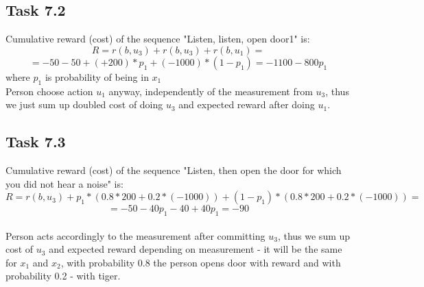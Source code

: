 \documentclass[english]{scrartcl}
\begin{document}
\subsection*{Task 7.2}
Cumulative reward (cost) of the sequence "Listen, listen, open door1" is: 
$$R=r(b,u_3)+r(b,u_3)+r(b,u_1)=$$
$$=-50-50+(+200)*p_{1}+(-1000)*(1-p_{1})=-1100-800p_1$$ where $p_1$ is probability of being in $x_1$
\\Person choose action $u_{1}$ anyway, independently of the measurement from $u_{3}$, thus we just sum up doubled cost of doing $u_{3}$ and expected reward after doing $u_{1}$.

\subsection*{Task 7.3}
Cumulative reward (cost) of the sequence "Listen, then open the door for which you did not hear a noise" is:
$$R=r(b,u_3)+p_1*(0.8*200+0.2*(-1000)) + (1-p_1)*(0.8*200+0.2*(-1000))=$$
$$=-50-40p_1-40+40p_1=-90$$
\\Person acts accordingly to the measurement after committing $u_{3}$, thus we sum up cost of $u_3$ and expected reward depending on measurement - it will be the same for $x_1$ and $x_2$, with probability 0.8 the person opens door with reward and with probability 0.2 - with tiger.
\end{document}
